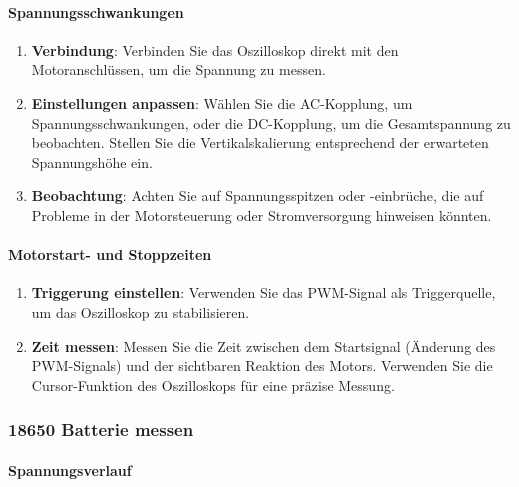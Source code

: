 \documentclass{vorlage-design-main}
\begin{document}
\hypertarget{spannungsschwankungen}{%
\paragraph{Spannungsschwankungen}\label{spannungsschwankungen}}

\begin{enumerate}
\def\labelenumi{\arabic{enumi}.}

\item
  \textbf{Verbindung}: Verbinden Sie das Oszilloskop direkt mit den
  Motoranschlüssen, um die Spannung zu messen.
\item
  \textbf{Einstellungen anpassen}: Wählen Sie die AC-Kopplung, um
  Spannungsschwankungen, oder die DC-Kopplung, um die Gesamtspannung zu
  beobachten. Stellen Sie die Vertikalskalierung entsprechend der
  erwarteten Spannungshöhe ein.
\item
  \textbf{Beobachtung}: Achten Sie auf Spannungsspitzen oder -einbrüche,
  die auf Probleme in der Motorsteuerung oder Stromversorgung hinweisen
  könnten.
\end{enumerate}

\hypertarget{motorstart--und-stoppzeiten}{%
\paragraph{Motorstart- und
Stoppzeiten}\label{motorstart--und-stoppzeiten}}

\begin{enumerate}
\def\labelenumi{\arabic{enumi}.}

\item
  \textbf{Triggerung einstellen}: Verwenden Sie das PWM-Signal als
  Triggerquelle, um das Oszilloskop zu stabilisieren.
\item
  \textbf{Zeit messen}: Messen Sie die Zeit zwischen dem Startsignal
  (Änderung des PWM-Signals) und der sichtbaren Reaktion des Motors.
  Verwenden Sie die Cursor-Funktion des Oszilloskops für eine präzise
  Messung.
\end{enumerate}

\hypertarget{batterie-messen}{%
\subsubsection{18650 Batterie messen}\label{batterie-messen}}

\hypertarget{spannungsverlauf}{%
\paragraph{Spannungsverlauf}\label{spannungsverlauf}}
\end{document}
